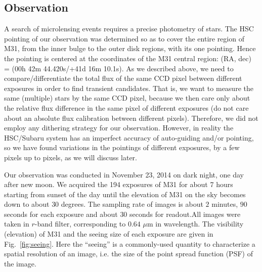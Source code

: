 \documentclass[iop, apj]{emulateapj}
\newcommand{\?}{\stackrel{?}{=}}
\begin{document}
\subsection{Observation}
\label{sec:obsm31}
A search of microlensing events requires a precise photometry of stars. 
The HSC pointing of our observation was determined so as to cover the entire region of M31, from the inner bulge to the outer disk regions, with its one pointing. Hence the pointing is centered at the coordinates of the M31 central region: (RA, dec) = (00h 42m 44.420s/+41d 16m 10.1s). 
As we described above, we need to compare/differentiate the total flux of the same CCD pixel between different exposures in order to find transient candidates. That is, we want to measure the same (multiple) stars by the same CCD pixel, because we then care only about the relative flux difference in the same pixel of different exposures (do not care about an absolute flux calibration between different pixels). Therefore, we did not employ any dithering strategy for our observation. However, in reality the HSC/Subaru system has an imperfect accuracy of auto-guiding and/or pointing, so we have found  variations in the pointings of different exposures, by a few pixels up to pixels, as we will discuss later. 

Our observation was conducted in November 23, 2014 on dark night, one day after new moon. We acquired the 194 exposures of M31 for about 7 hours starting from sunset of the day until the elevation of M31 on the sky becomes down to about $30$  degrees. The sampling rate of images is about $2$ minutes, $90$ seconds for each exposure and about $30$ seconds for readout.All images were taken in $r$-band filter, corresponding to $0.64$ $\mu$m in wavelength. The visibility (elevation) of M31 and the seeing size of each exposure are given in Fig.~\ref{fig:seeing}. Here the ``seeing'' is a commonly-used quantity to characterize a spatial resolution of an image, i.e. the size of the point spread function (PSF) of the image. 
%
%
\end{document}
